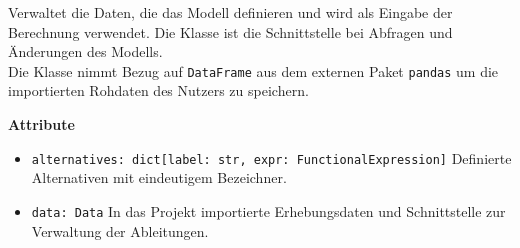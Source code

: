 \documentclass{article}
\begin{document}
Verwaltet die Daten, die das Modell definieren und wird als Eingabe der Berechnung verwendet. Die Klasse ist die Schnittstelle bei Abfragen und Änderungen des Modells.\\
Die Klasse nimmt Bezug auf \texttt{DataFrame} aus dem externen Paket \texttt{pandas} um die importierten Rohdaten des Nutzers zu speichern.
\newline \newline

\textbf{{Attribute}}
\begin{itemize}
\item \texttt{alternatives: dict[label: str, expr: FunctionalExpression]} \newline
Definierte Alternativen mit eindeutigem Bezeichner.
\item \texttt{data: Data} \newline In das Projekt importierte Erhebungsdaten und Schnittstelle zur Verwaltung der Ableitungen.
\\\\
\end{itemize}
\end{document}

